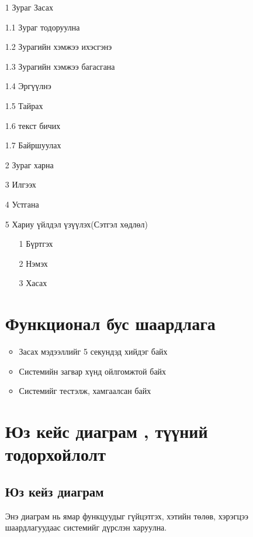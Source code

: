 \begin{itemize}
	\item [1]Зураг Засах
	\item [1.1] Зураг тодоруулна
	\item [1.2] Зурагийн хэмжээ ихэсгэнэ
	\item [1.3] Зурагийн хэмжээ багасгана
	\item [1.4] Эргүүлнэ
	\item [1.5] Тайрах
	\item [1.6]текст бичих
	\item [1.7]Байршуулах
	\item [2] Зураг харна
	\item [3]Илгээх
	\item [4]Устгана
	\item [5]Хариу үйлдэл үзүүлэх(Сэтгэл хөдлөл)
	\begin{itemize}
		\item [1]Бүртгэх
		\item [2]Нэмэх
		\item [3]Хасах
	\end{itemize}
	\section{Функционал бус шаардлага}
	\begin{itemize}
		\item Засах мэдээллийг 5 секундэд хийдэг байх
		\item Системийн загвар хүнд ойлгомжтой байх
		\item Системийг тестэлж, хамгаалсан байх
\end{itemize}
\newpage
\section{ Юз кейс диаграм , түүний тодорхойлолт }

\subsection{Юз кейз  диаграм} 
Энэ диаграм нь ямар функцуудыг гүйцэтгэх, хэтийн төлөв, хэрэгцээ шаардлагуудаас системийг дүрслэн харуулна. 

\newpage


\end{itemize}
